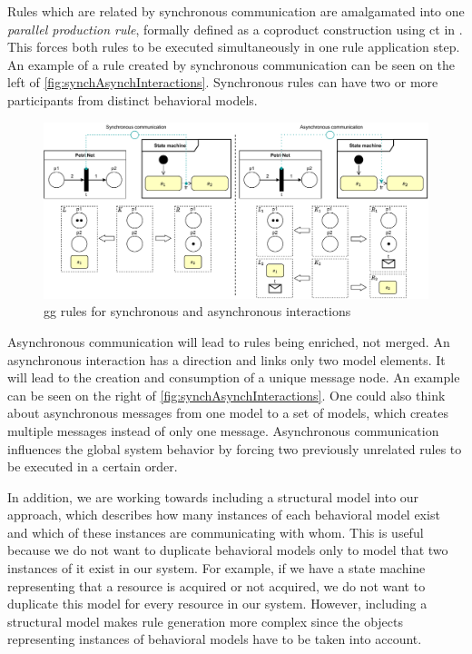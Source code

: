 \documentclass[a4paper]{easychair}
\begin{document}
Rules which are related by synchronous communication are amalgamated into one \textit{parallel production rule}, formally defined as a coproduct construction using \gls*{ct} in \cite[Def. 3.2.7]{baldanConcurrentSemanticsAlgebraic1999}.
This forces both rules to be executed simultaneously in one rule application step. 
An example of a rule created by synchronous communication can be seen on the left of \autoref{fig:synchAsynchInteractions}.
Synchronous rules can have two or more participants from distinct behavioral models.  

\begin{figure}[h]
    \centering
    \includegraphics[width=1\textwidth]{images/synch_asynch.pdf}
    \caption{\gls*{gg} rules for synchronous and asynchronous interactions}
    \label{fig:synchAsynchInteractions}
\end{figure}

Asynchronous communication will lead to rules being enriched, not merged.
An asynchronous interaction has a direction and links only two model elements.
It will lead to the creation and consumption of a unique message node.
An example can be seen on the right of \autoref{fig:synchAsynchInteractions}. 
One could also think about asynchronous messages from one model to a set of models, which creates multiple messages instead of only one message.
Asynchronous communication influences the global system behavior by forcing two previously unrelated rules to be executed in a certain order.

In addition, we are working towards including a structural model into our approach, which describes how many instances of each behavioral model exist and which of these instances are communicating with whom.
This is useful because we do not want to duplicate behavioral models only to model that two instances of it exist in our system.
For example, if we have a state machine representing that a resource is acquired or not acquired, we do not want to duplicate this model for every resource in our system.
However, including a structural model makes rule generation more complex since the objects representing instances of behavioral models have to be taken into account.
\end{document}
